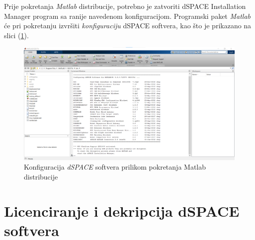Prije pokretanja \textit{Matlab} distribucije, potrebno je zatvoriti dSPACE Installation Manager program sa ranije navedenom konfiguracijom. Programski paket \textit{Matlab} će pri pokretanju izvršiti \textit{konfiguraciju} dSPACE softvera, kao što je prikazano na slici (\ref{fig:matlab-configure}).

\begin{figure}[h]
\begin{center}
\includegraphics[width=\textwidth]{slike/dSpace/matlab-configure.png}
\end{center}
\caption{Konfiguracija \textit{dSPACE} softvera prilikom pokretanja Matlab distribucije}
\label{fig:matlab-configure}
\end{figure}

\section{Licenciranje i dekripcija dSPACE softvera}